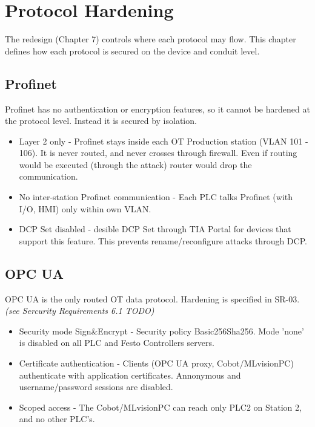 \section{Protocol Hardening}
The redesign (Chapter 7) controls where each protocol may flow. 
This chapter defines how each protocol is secured on the device and conduit level.

\subsection{Profinet}
Profinet has no authentication or encryption features, so it cannot be hardened at the 
protocol level. Instead it is secured by isolation.
\begin{itemize}
    \item Layer 2 only - Profinet stays inside each OT Production station (VLAN 101 - 106).
        It is never routed, and never crosses through firewall. Even if routing would be 
        executed (through the attack) router would drop the communication.
    \item No inter-station Profinet communication - Each PLC talks Profinet (with I/O, HMI) only 
        within own VLAN.
    \item DCP Set disabled - desible DCP Set through TIA Portal for devices that support this feature.
        This prevents rename/reconfigure attacks through DCP.
\end{itemize}

\subsection{OPC UA}
OPC UA is the only routed OT data protocol. Hardening is specified in SR-03. \textit{(see Sercurity Requirements 6.1 TODO)}
\begin{itemize}
    \item Security mode Sign\&Encrypt - Security policy Basic256Sha256. Mode 'none' is disabled
        on all PLC and Festo Controllers servers.
    \item Certificate authentication - Clients (OPC UA proxy, Cobot/MLvisionPC) authenticate with application
        certificates. Annonymous and username/password sessions are disabled.
    \item Scoped access - The Cobot/MLvisionPC can reach only PLC2 on Station 2, and no other PLC's.
\end{itemize}

